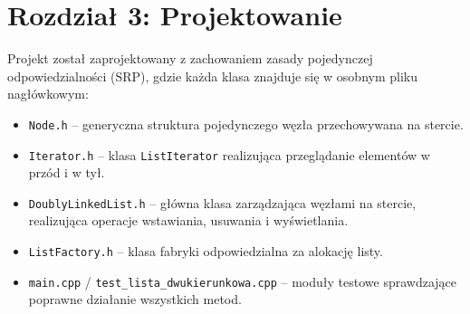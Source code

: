 \section{Rozdział 3: Projektowanie}

Projekt został zaprojektowany z zachowaniem zasady pojedynczej odpowiedzialności (SRP), gdzie każda klasa znajduje się w osobnym pliku nagłówkowym:

\begin{itemize}
    \item \texttt{Node.h} -- generyczna struktura pojedynczego węzła przechowywana na stercie.
    \item \texttt{Iterator.h} -- klasa \texttt{ListIterator} realizująca przeglądanie elementów w przód i w tył.
    \item \texttt{DoublyLinkedList.h} -- główna klasa zarządzająca węzłami na stercie, realizująca operacje wstawiania, usuwania i wyświetlania.
    \item \texttt{ListFactory.h} -- klasa fabryki odpowiedzialna za alokację listy.
    \item \texttt{main.cpp} / \texttt{test\_lista\_dwukierunkowa.cpp} -- moduły testowe sprawdzające poprawne działanie wszystkich metod.
\end{itemize}